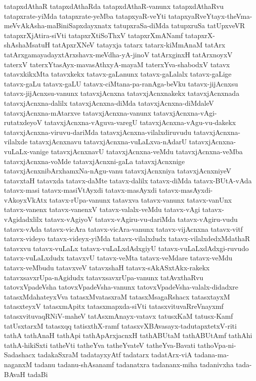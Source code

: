 {tatapxdAthaR
tatapxdAthaRda
tatapxdAthaR-vanunx
tatapxdAthaRvu
tatapxrate-yiMda
tatapxrate-yeMba
tatapxyaR-veYti
tatapxyaRveYtayx-theVma-meVvAkAsha-maBiniSapxdayxnatx
tatupxraSa-diMda
tatupxruSa
tatUpxveVR
tatapxrXjAtira-siVti
tatapxrXtiSoThxV
tatapxrXmANamf
tatapxrX-shAshaMsatuH
tatApxrXNeV
tatayxja
tatarx
tatarx-kiMmAnaM
tatArx
tatArxgamayadayxtArxshavx-meVdha-yA-jinoV
tatArxginxH
tatArxnoyxV
taterxV
taterxYtasAyx-mavasAthxyA-mayaM
taterxYva-shabodxV
tatavx
tatavxkikxMta
tatavxkekx
tatavx-gaLanunx
tatavx-gaLalalx
tatavx-gaLige
tatavx-gaLu
tatavx-gaLU
tatavx-ciMtana-pa-ranAga-beVku
tatavx-jijAcnxsu
tatavx-jijAcnxsu-vanunx
tatavxjAcnxna
tatavxjAcnxnakekx
tatavxjAcnxnada
tatavxjAcnxna-dalilx
tatavxjAcnxna-diMda
tatavxjAcnxna-diMdaleV
tatavxjAcnxna-mAtarxve
tatavxjAcnxna-vanunx
tatavxjAcnxna-vAgi-rutatxdeyoV
tatavxjAcnxna-vAguva-varegU
tatavxjAcnxna-vAgu-vu-dakekx
tatavxjAcnxna-viruvu-dariMda
tatavxjAcnxna-vilalxdiruvudu
tatavxjAcnxna-vilalxde
tatavxjAcnxnavu
tatavxjAcnxna-vuLaLxva-nAdarU
tatavxjAcnxna-vuLaLx-vanige
tatavxjAcnxnavU
tatavxjAcnxna-veMdu
tatavxjAcnxna-veMba
tatavxjAcnxna-voMde
tatavxjAcnxni-gaLa
tatavxjAcnxnige
tatavxjAcnxnibArxhamxNa-nAgu-vanu
tatavxjAcnxniya
tatavxjAcnxniyeV
tatavxtaH
tatavxda
tatavx-daMte
tatavx-dalilx
tatavx-diMda
tatavx-BUtA-vAda
tatavx-masi
tatavx-masiVtAyxdi
tatavx-masAyxdi
tatavx-masAyxdi-vAkoyxVkAtx
tatavx-rUpa-vanunx
tatavxva
tatavx-vanunx
tatavx-vanUnx
tatavx-vanenx
tatavx-vanenxV
tatavx-valalx-veMdu
tatavx-vAgi
tatavx-vAgidadxlilx
tatavx-vAgiyoV
tatavx-vAgiru-vu-dariMda
tatavx-vAgiru-vudu
tatavx-vAda
tatavx-vicAra
tatavx-vicAra-vanunx
tatavx-vijAcnxna
tatavx-vitf
tatavx-videyo
tatavx-videyx-yiMda
tatavx-vilalxdudx
tatavx-vilalxdedxMdathaR
tatavxvu
tatavx-vuLaLx
tatavx-vuLaLxdAdxgiyU
tatavx-vuLaLxdAdxgi-ruvudo
tatavx-vuLaLxdudx
tatavxvU
tatavx-veMta
tatavx-veMdare
tatavx-veMdu
tatavx-veMbudu
tatavxveV
tatavxshaH
tatavx-sAkASxtAkx-rakekx
tatavxsavxrUpa-nAgidudx
tatavxsavxrUpa-vanunx
tatAvxthaRvu
tatovxVpadeVsha
tatovxVpadeVsha-vanunx
tatovxVpadeVsha-valalx-didadxre
tatasxMdahateyxVva
tatasxMvatasxraM
tatasxMsagaRshacx
tatasxtayxM
tatasxteyxV
tatasxmApitx
tatasxmapxda-siVti
tatasxvituvaRreVnayxmf
tatasxvituvaqRNiV-maheV
tatAsxmAnayx-vatavx
tatusxKaM
tatusx-Kamf
tatUsxtarxM
tatasxqq
tatisxthX-ramf
tatasxvXBAvasayx-tadutapxtetxV-riti
tathA
tathAnaH
tathApi
tathApArxjacnxH
tathABUtaM
tathABUtAmf
tathAhi
tathA-hikiSxti
tatheVti
tatheYva
tatheYvateV
tatheYva-Bavati
tathoVpa-ni-Sadashacx
tadakaSxraM
tadatayxyAtf
tadatarx
tadatArx-viA
tadana-ma-naganxM
tadanu
tadanu-shAsanamf
tadanatxra
tadananx-miha
tadanivxha
tada-BAvaH
tadaBi
}
